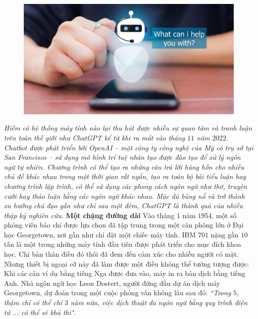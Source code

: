 \begin{multicols}{2}
	\begin{figure}[H]
		\vspace*{6pt}
		\centering
		\captionsetup{labelformat= empty, justification=centering}
		\includegraphics[width= 1\linewidth]{GPT.png}
		\vspace*{-15pt}
	\end{figure}
	\textit{Hiếm có hệ thống máy tính nào lại thu hút được nhiều sự quan tâm và tranh luận trên toàn thế giới như ChatGPT kể từ khi ra mắt vào tháng $11$ năm $2022$. Chatbot được phát triển bởi OpenAI -- một công ty công nghệ của Mỹ có trụ sở tại San Francisco -- sử dụng mô hình trí tuệ nhân tạo được đào tạo để xử lý ngôn ngữ tự nhiên. Chương trình có thể tạo ra những câu trả lời hùng hồn cho nhiều chủ đề khác nhau trong một thời gian rất ngắn, tạo ra toàn bộ bài tiểu luận hay chương trình lập trình, có thể sử dụng các phong cách ngôn ngữ như thơ, truyện cười hay thảo luận bằng các ngôn ngữ khác nhau.}
	\vskip 0.1cm
	\textit{Mặc dù bùng nổ và trở thành xu hướng chủ đạo gần như chỉ sau một đêm, ChatGPT là thành quả của nhiều thập kỷ nghiên cứu.}
	\vskip 0.1cm
	\textbf{\color{timhieukhoahoc}Một chặng đường dài}
	\vskip 0.1cm
	Vào tháng $1$ năm $1954$, một số phóng viên báo chí được lựa chọn đã tập trung trong một căn phòng lớn ở Đại học Georgetown, nơi gần như chỉ đặt một chiếc máy tính. IBM $701$ nặng gần $10$ tấn là một trong những máy tính đầu tiên được phát triển cho mục đích khoa học. Chỉ bản thân điều đó thôi đã đem đến cảm xúc cho nhiều người có mặt. Nhưng thiết bị ngoại cỡ này đã làm được một điều không thể tưởng tượng được: Khi các câu ví dụ bằng tiếng Nga được đưa vào, máy in ra bản dịch bằng tiếng Anh. Nhà ngôn ngữ học Leon Dostert, người đứng đầu dự án dịch máy Georgetown, dự đoán trong một cuộc phỏng vấn không lâu sau đó: \textit{``Trong $5$, thậm chí có thể chỉ $3$ năm nữa, việc dịch thuật đa ngôn ngữ bằng quy trình điện tử ... có thể sẽ khả thi"}. 

\end{multicols}
